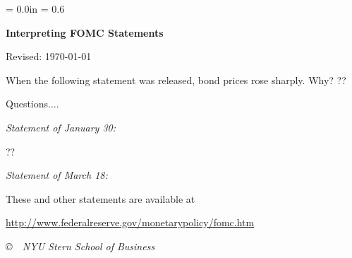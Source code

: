 \documentclass[letterpaper,12pt]{article}
\def\HeadName{Interpreting FOMC Statements}
\begin{document}
\parindent = 0.0in
\parskip = 0.6\bigskipamount
\thispagestyle{empty}%
\Head

\centerline{\large \bf \HeadName}%
\centerline{Revised:  \today}

\bigskip 
When the following statement was released, bond prices rose sharply.  
Why?  ??

Questions....  

\pagebreak
\medskip
{\it Statement of January 30:} 

??

\medskip
{\it Statement of March 18:} 





These and other statements are available at 

\bigskip
\centerline{
\href{http://www.federalreserve.gov/monetarypolicy/fomc.htm}
{http://www.federalreserve.gov/monetarypolicy/fomc.htm}
}

\vfill \centerline{\it \copyright \ \number\year \ NYU Stern
School of Business}
\end{document}
